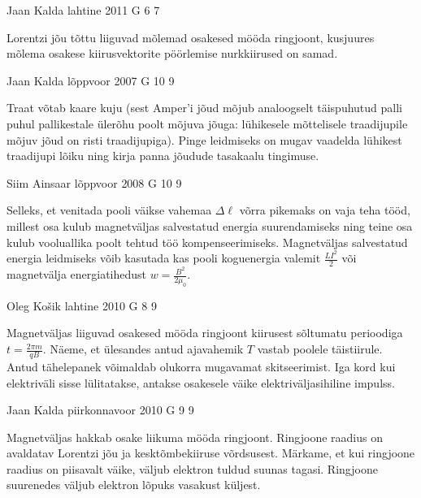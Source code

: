 \documentclass[11pt, twoside]{article}
\begin{document}
{%
{Jaan Kalda} %
{lahtine} %
{2011} %
{G 6} %
{7} %
{

\ifHint
Lorentzi jõu tõttu liiguvad mõlemad osakesed mööda ringjoont, kusjuures mõlema osakese kiirusvektorite pöörlemise nurkkiirused on samad.
\fi
}

{Jaan Kalda} %
{lõppvoor} %
{2007} %
{G 10} %
{9} %
{

\ifHint
Traat võtab kaare kuju (sest Amper’i jõud mõjub analoogselt täispuhutud palli puhul pallikestale ülerõhu poolt mõjuva jõuga: lühikesele mõttelisele traadijupile mõjuv jõud on risti traadijupiga). Pinge leidmiseks on mugav vaadelda lühikest traadijupi lõiku ning kirja panna jõudude tasakaalu tingimuse.
\fi
}

{Siim Ainsaar} %
{lõppvoor} %
{2008} %
{G 10} %
{9} %
{

\ifHint
Selleks, et venitada pooli väikse vahemaa $\Delta \ell$ võrra pikemaks on vaja teha tööd, millest osa kulub magnetväljas salvestatud energia suurendamiseks ning teine osa kulub vooluallika poolt tehtud töö kompenseerimiseks. Magnetväljas salvestatud energia leidmiseks võib kasutada kas pooli koguenergia valemit $\frac{LI^2}{2}$ või magnetvälja energiatihedust $w = \frac{B^2}{2\mu_0}$.
\fi
}

{Oleg Košik} %
{lahtine} %
{2010} %
{G 8} %
{9} %
{

\ifHint
Magnetväljas liiguvad osakesed mööda ringjoont kiirusest sõltumatu perioodiga $t = \frac{2\pi m}{qB}$. Näeme, et ülesandes antud ajavahemik $T$ vastab poolele täistiirule. Antud tähelepanek võimaldab olukorra mugavamat skitseerimist. Iga kord kui elektriväli sisse lülitatakse, antakse osakesele väike elektriväljasihiline impulss.
\fi
}

{Jaan Kalda} %
{piirkonnavoor} %
{2010} %
{G 9} %
{9} %
{

\ifHint
Magnetväljas hakkab osake liikuma mööda ringjoont. Ringjoone raadius on avaldatav Lorentzi jõu ja kesktõmbekiiruse võrdsusest.
Märkame, et kui ringjoone raadius on piisavalt väike, väljub elektron tuldud suunas tagasi. Ringjoone suurenedes väljub elektron lõpuks vasakust küljest.
\fi
}

}
\end{document}
